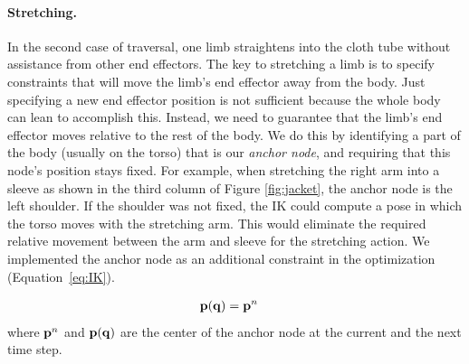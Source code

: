 \paragraph{Stretching.} In the second case of traversal, one limb straightens into the cloth tube without assistance from other end effectors. The key to stretching a limb is to specify constraints that will move the limb's end effector away from the body. Just specifying a new end effector position is not sufficient because the whole body can lean to accomplish this.  Instead, we need to guarantee that the limb's end effector moves relative to the rest of the body.  We do this by identifying a part of the body (usually on the torso) that is our \emph{anchor node}, and requiring that this node's position stays fixed. For example, when stretching the right arm into a sleeve as shown in the third column of Figure \ref{fig:jacket}, the anchor node is the left shoulder. If the shoulder was not fixed, the IK could compute a pose in which the torso moves with the stretching arm. This would eliminate the required relative movement between the arm and sleeve for the stretching action. We implemented the anchor node as an additional constraint in the optimization (Equation~\ref{eq:IK}).


\begin{align}
  \label{eq:fixtureNode}
  \nonumber  \mathbf{p}(\mathbf{q})& = \mathbf{p}^n
\end{align}
where $\mathbf{p}^n$ and $\mathbf{p(q)}$ are the center of the anchor node at the current and the next time step.

